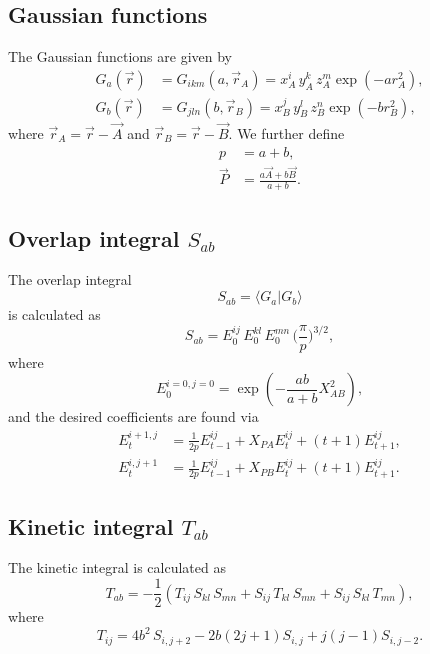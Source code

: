 \subsection*{Gaussian functions}
The Gaussian functions are given by
\begin{equation}
 \begin{split}
  G_a(\vec r) & = G_{ikm}(a, \vec r_A) = x^i_A\,y^k_A\,z^m_A\exp(-a r^2_A), \\
  G_b(\vec r) & = G_{jln}(b, \vec r_B) = x^j_B\,y^l_B\,z^n_B\exp(-b r^2_B),
 \end{split}
\end{equation}
where $\vec r_A = \vec r - \vec A$ and $\vec r_B = \vec r - \vec B$. We further define
\begin{equation}
\begin{split}
  p & = a + b, \\
 \vec P & = \frac{a\vec A + b\vec B}{a + b}.
\end{split}
\end{equation}


\subsection*{Overlap integral $S_{ab}$}
The overlap integral
\begin{equation}
 S_{ab} = \langle G_a|G_b\rangle
\end{equation}
is calculated as
\begin{equation}
\label{eq:Sab_compute}
 S_{ab} = E^{ij}_0\,E^{kl}_0\,E^{mn}_0\,\Big(\frac{\pi}{p}\Big)^{3/2},
\end{equation}
where
\begin{equation}
 E^{i=0,j=0}_0 = \exp(-\frac{ab}{a+b}X_{AB}^2),
\end{equation}
and the desired coefficients are found via
\begin{equation}
\begin{split}
 E^{i+1,j}_t & = \frac{1}{2p}E^{ij}_{t-1} + X_{PA}E^{ij}_t + (t+1)E^{ij}_{t+1}, \\
 E^{i,j+1}_t & = \frac{1}{2p}E^{ij}_{t-1} + X_{PB}E^{ij}_t + (t+1)E^{ij}_{t+1}.
\end{split}
\end{equation}



\subsection*{Kinetic integral $T_{ab}$}
The kinetic integral is calculated as
\begin{equation}
\label{eq:Tab_compute}
 T_{ab} = -\frac{1}{2}(T_{ij}\,S_{kl}\,S_{mn} + S_{ij}\,T_{kl}\,S_{mn} + S_{ij}\,S_{kl}\,T_{mn}),
\end{equation}
where
\begin{equation}
 T_{ij} = 4b^2\,S_{i,j+2} - 2b(2j + 1)S_{i,j} + j(j-1)S_{i,j-2}.
\end{equation}

